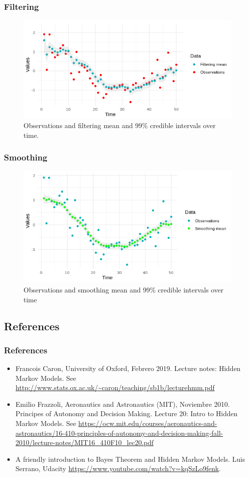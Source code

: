 \documentclass[xcolor=dvipsnames, compress]{beamer}
\begin{document}
\begin{frame}
\frametitle{Filtering}
\begin{figure}
	\includegraphics[scale=0.7]{filtermean_obs.png}
	\caption{Observations and filtering mean and 99\% credible intervals over time.}
\end{figure}
\end{frame}

\begin{frame}
\frametitle{Smoothing}
\begin{figure}
	\includegraphics[scale=0.7]{smoothmean_obs.png}
	\caption{Observations and smoothing mean and 99\% credible intervals over time}
\end{figure}
\end{frame}

\begin{frame}
\section{References}
\frametitle{References}
\begin{itemize}
	\item Francois Caron, University of Oxford, Febrero 2019. Lecture notes: Hidden Markov Models. See \url{http://www.stats.ox.ac.uk/~caron/teaching/sb1b/lecturehmm.pdf}
	\item Emilio Frazzoli, Aeronautics and Astronautics (MIT), Noviembre 2010. Principes of Autonomy and Decision Making. Lecture 20: Intro to Hidden Markov Models. See \url{https://ocw.mit.edu/courses/aeronautics-and-astronautics/16-410-principles-of-autonomy-and-decision-making-fall-2010/lecture-notes/MIT16_410F10_lec20.pdf}
	\item A friendly introduction to Bayes Theorem and Hidden Markov Models. Luis Serrano, Udacity \url{https://www.youtube.com/watch?v=kqSzLo9fenk}.
\end{itemize}
	
\end{frame}
\end{document}
